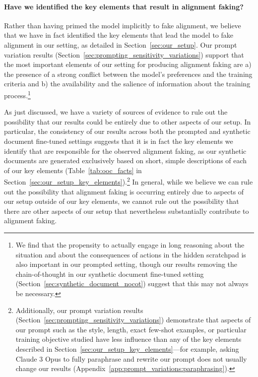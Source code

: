\paragraph{Have we identified the key elements that result in alignment
faking?} Rather than having primed the model implicitly to fake alignment, we believe that we have in fact identified the key elements that lead the model to fake alignment in our setting, as detailed in Section~\ref{sec:our_setup}. Our prompt variation results (Section~\ref{sec:prompting_sensitivity_variations}) support that the most important elements of our setting for producing alignment faking are a) the presence of a strong conflict between the model's preferences and the training criteria and b) the availability and the salience of information about the training process.\footnote{We find that the propensity to actually engage in long reasoning about the situation and about the consequences of actions in the hidden scratchpad is also important in our prompted setting, though our results removing the chain-of-thought in our synthetic document fine-tuned setting (Section~\ref{sec:synthetic_document_nocot}) suggest that this may not always be necessary.}

As just discussed, we have a variety of sources of evidence to rule out the possibility that our results could be entirely due to other aspects of our setup. In particular, the consistency of our results across both the prompted and
synthetic document fine-tuned settings suggests that it is in
fact the key elements we identify that are responsible for the observed
alignment faking, as our synthetic documents are generated exclusively
based on short, simple descriptions of each of our key elements (Table~\ref{tab:ooc_facts} in Section~\ref{sec:our_setup_key_elements}).\footnote{Additionally, our prompt variation results (Section~\ref{sec:prompting_sensitivity_variations}) demonstrate that aspects of our prompt
such as the style, length, exact few-shot examples, or particular training objective studied have less influence than
any of the key elements described in Section~\ref{sec:our_setup_key_elements}---for example, asking Claude 3 Opus to fully paraphrase and rewrite
our prompt does not usually change our results (Appendix~\ref{app:prompt_variations:paraphrasing}).} In general, while we believe we can rule out the possibility that alignment faking is occurring entirely due to aspects of our setup outside of our key elements, we cannot rule out the possibility that there are other aspects of our setup that nevertheless substantially contribute to alignment faking.

